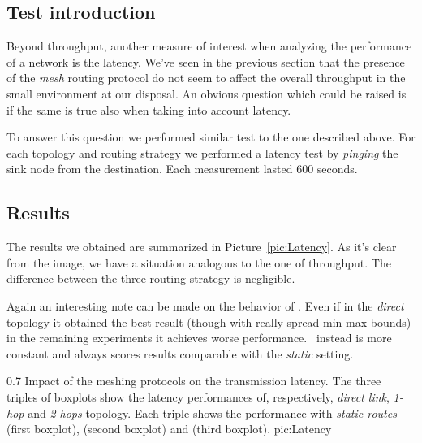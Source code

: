 \subsection{Test introduction}
    Beyond throughput, another measure of interest when analyzing the
    performance of a network is the latency. We've seen in the
    previous section that the presence of the \emph{mesh} routing
    protocol do not seem to affect the overall throughput in the small
    environment at our disposal. An obvious question which could be
    raised is if the same is true also when taking into account latency.

    To answer this question we performed similar test to the one
    described above. For each topology and routing strategy we
    performed a latency test by \emph{pinging} the sink node from the
    destination. Each measurement lasted 600 seconds.

\subsection{Results}
The results we obtained are summarized in
Picture~\ref{pic:Latency}. As it's clear from the image, we have a
situation analogous to the one of throughput. The difference between
the three routing strategy is negligible.

Again an interesting note can be made on the behavior of \olsr. Even
if in the \emph{direct} topology it obtained the best result (though
with really spread min-max bounds) in the remaining experiments it
achieves worse performance. \batman\ instead is more constant and
always scores results comparable with the \emph{static} setting.

        {0.7 \columnwidth}
        {Impact of the meshing protocols on the transmission latency. The
         three triples of boxplots show the latency performances of,
         respectively, \emph{direct link}, \emph{1-hop} and \emph{2-hops}
         topology. Each triple shows the performance with \emph{static
         routes} (first boxplot), \emph{\batman} (second boxplot) and
         \emph{\olsr} (third boxplot).}
        {pic:Latency}

